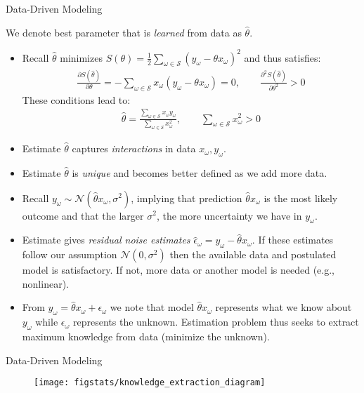 \documentclass[9pt]{beamer}
\begin{document}
%
\begin{frame}{Data-Driven Modeling}

We denote best parameter that is {\em learned} from data as $\hat{\theta}$. 
\begin{itemize}
\item Recall $\hat{\theta}$ minimizes $S(\theta)=\frac{1}{2}\sum_{\omega \in \mathcal{S}} (y_\omega-\theta x_\omega)^2$ and thus satisfies:
\begin{align*}
\frac{\partial S(\hat{\theta})}{\partial \theta}=-\sum_{\omega \in \mathcal{S}}x_\omega (y_\omega-\theta x_\omega)=0,\qquad  \frac{\partial^2 S(\hat{\theta})}{\partial \theta^2}>0
\end{align*}
These conditions lead to:
\begin{align*}
\hat{\theta}=\frac{\sum_{\omega \in \mathcal{S}}x_\omega y_\omega}{\sum_{\omega \in \mathcal{S}}x_\omega^2},\qquad \sum_{\omega \in \mathcal{S}}x_\omega^2>0 
\end{align*}
\item Estimate $\hat{\theta}$ captures {\em interactions} in data $x_\omega,y_\omega$. 
\item Estimate $\hat{\theta}$ is {\em unique} and becomes better defined as we add more data. 
\item Recall $y_\omega \sim \mathcal{N}(\hat{\theta} x_\omega,\sigma^2)$, implying that prediction $\hat{\theta} x_\omega$ is the most likely outcome and that the larger $\sigma^2$, the more uncertainty we have in $y_\omega$. 
\item Estimate gives {\em residual noise estimates} $\hat{\epsilon}_\omega =y_\omega-\hat{\theta}x_\omega$. If these estimates follow our assumption $\mathcal{N}(0,\sigma^2)$ then the available data and postulated model is satisfactory. If not, more data or another model is needed (e.g., nonlinear). 

\item From $y_\omega=\hat{\theta}x_\omega+\epsilon_\omega$ we note that model $\hat{\theta}x_\omega$ represents what we know about $y_\omega$ while $\epsilon_\omega$ represents the unknown. Estimation problem thus seeks to extract maximum knowledge from data (minimize the unknown). 
\end{itemize}
\end{frame}

%
\begin{frame}{Data-Driven Modeling}

\begin{figure}[!htb]
    \centering
	\texttt{[image: figstats/knowledge\_extraction\_diagram]}
\end{figure}

\end{frame}
\end{document}
